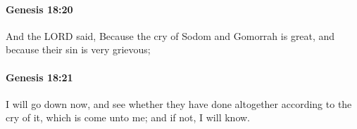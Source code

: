 		\paragraph{Genesis 18:20} %
			\label{GENESIS-18-20}

			And the LORD said, Because the cry of Sodom and Gomorrah is great, and because their sin is very grievous;


		\paragraph{Genesis 18:21} %
			\label{GENESIS-18-21}

			I will go down now, and see whether they have done altogether according to the cry of it, which is come unto me; and if not, I will know.


